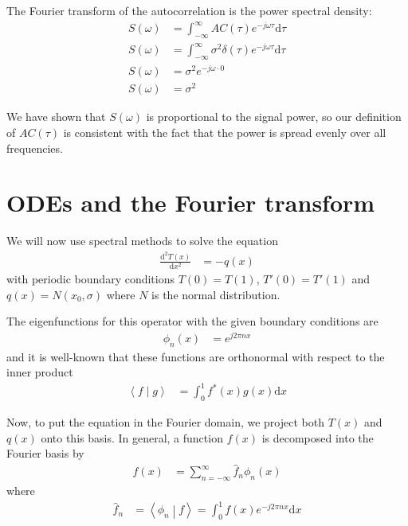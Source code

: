 \documentclass[twocolumn]{myarticle}
\renewcommand{\d}{\mathrm{d}}
\begin{document}
The Fourier transform of the autocorrelation is the power spectral density:
\begin{align}
    S(\omega) &= \int_{-\infty}^{\infty} AC(\tau) e^{-j\omega \tau} \d \tau
    \\
    S(\omega) &= \int_{-\infty}^{\infty} \sigma^2 \delta(\tau) e^{-j\omega \tau} \d \tau
    \\
    S(\omega) &= \sigma^2 e^{-j \omega \cdot 0}
    \\
    S(\omega) &= \sigma^2 
\end{align}

We have shown that $ S(\omega) $ is proportional to the signal power, so our definition of $ AC(\tau) $ is consistent with the fact that the power is spread evenly over all frequencies.

\section{ODEs and the Fourier transform}
\label{sec:odes_and_the_fourier_transform}

We will now use spectral methods to solve the equation
\begin{align}
    \frac{\d^2 T(x)}{\d x^2} &= - q(x)
\end{align}
with periodic boundary conditions $ T(0) = T(1) $, $ T'(0) = T'(1) $ and $ q(x) = N(x_0, \sigma) $ where $ N $ is the normal distribution.

The eigenfunctions for this operator with the given boundary conditions are
\begin{align}
    \phi_n(x) &= e^{j 2 \pi n x}
\end{align}
and it is well-known that these functions are orthonormal with respect to the inner product
\begin{align}
    \left\langle f \middle| g \right\rangle &= \int_0^1 f^*(x) g(x) \d x
\end{align}

Now, to put the equation in the Fourier domain, we project both $ T(x) $ and $ q(x) $ onto this basis.
In general, a function $ f(x) $ is decomposed into the Fourier basis by
\begin{align}
    f(x) &= \sum_{n = -\infty}^{\infty} \hat{f}_n \phi_n(x)
\end{align}
where
\begin{align}
    \hat{f}_n &= \left\langle \phi_n \middle| f \right\rangle = \int_0^1 f(x) e^{-j 2 \pi n x} \d x
\end{align}
\end{document}
